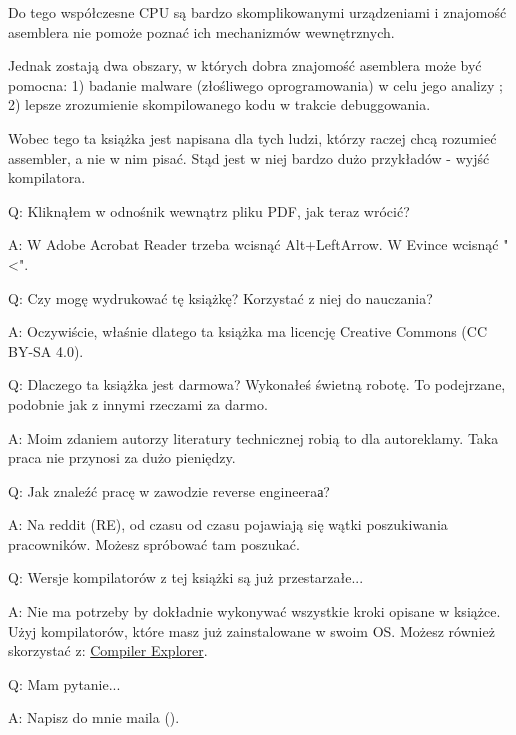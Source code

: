 Do tego współczesne \ac{CPU} są bardzo skomplikowanymi urządzeniami i znajomość asemblera nie pomoże poznać ich mechanizmów wewnętrznych.

Jednak zostają dwa obszary, w których dobra znajomość asemblera może być pomocna:
1) badanie malware (złośliwego oprogramowania) w celu jego analizy ; 2) lepsze zrozumienie skompilowanego kodu w trakcie debuggowania.

Wobec tego ta książka jest napisana dla tych ludzi, którzy raczej chcą rozumieć assembler, a nie w nim pisać. Stąd jest w niej bardzo dużo przykładów - wyjść kompilatora.

\par Q: Kliknąłem w odnośnik wewnątrz pliku PDF, jak teraz wrócić?
\par A: W Adobe Acrobat Reader trzeba wcisnąć Alt+LeftArrow. W Evince wcisnąć "<".

\par Q: Czy mogę wydrukować tę książkę? Korzystać z niej do nauczania?
\par A: Oczywiście, właśnie dlatego ta książka ma licencję Creative Commons (CC BY-SA 4.0).

\par Q: Dlaczego ta książka jest darmowa? Wykonałeś świetną robotę. To podejrzane, podobnie jak z innymi rzeczami za darmo.
\par A: Moim zdaniem autorzy literatury technicznej robią to dla autoreklamy. Taka praca nie przynosi za dużo pieniędzy.

\par Q: Jak znaleźć pracę w zawodzie reverse engineeraа?
\par A: Na reddit (RE\FNURLREDDIT), od czasu od czasu pojawiają się wątki poszukiwania pracowników.
Możesz spróbować tam poszukać.


\par Q: Wersje kompilatorów z tej książki są już przestarzałe...
\par A: Nie ma potrzeby by dokładnie wykonywać wszystkie kroki opisane w książce.
Użyj kompilatorów, które masz już zainstalowane w swoim \ac{OS}.
Możesz również skorzystać z: \href{https://godbolt.org/}{Compiler Explorer}.

\par Q: Mam pytanie...
\par A: Napisz do mnie maila (\EMAILS).

